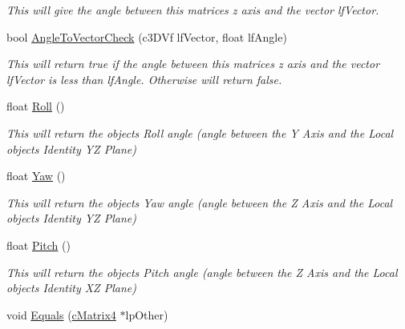 \begin{DoxyCompactItemize}
\begin{DoxyCompactList}\small\item\em This will give the angle between this matrices z axis and the vector lfVector. \end{DoxyCompactList}\item 
\hypertarget{classc_matrix4_a49146fe67ef49168a4136816398647dc}{
bool \hyperlink{classc_matrix4_a49146fe67ef49168a4136816398647dc}{AngleToVectorCheck} (c3DVf lfVector, float lfAngle)}
\label{classc_matrix4_a49146fe67ef49168a4136816398647dc}

\begin{DoxyCompactList}\small\item\em This will return true if the angle between this matrices z axis and the vector lfVector is less than lfAngle. Otherwise will return false. \end{DoxyCompactList}\item 
\hypertarget{classc_matrix4_ab118d7f14e3a34e1d65ed105aeea552e}{
float \hyperlink{classc_matrix4_ab118d7f14e3a34e1d65ed105aeea552e}{Roll} ()}
\label{classc_matrix4_ab118d7f14e3a34e1d65ed105aeea552e}

\begin{DoxyCompactList}\small\item\em This will return the objects Roll angle (angle between the Y Axis and the Local objects Identity YZ Plane) \end{DoxyCompactList}\item 
\hypertarget{classc_matrix4_af0b7c2e464763756c11b741d1f1266e4}{
float \hyperlink{classc_matrix4_af0b7c2e464763756c11b741d1f1266e4}{Yaw} ()}
\label{classc_matrix4_af0b7c2e464763756c11b741d1f1266e4}

\begin{DoxyCompactList}\small\item\em This will return the objects Yaw angle (angle between the Z Axis and the Local objects Identity YZ Plane) \end{DoxyCompactList}\item 
\hypertarget{classc_matrix4_a8832e5a8f1173fa0de619186ba13d0c2}{
float \hyperlink{classc_matrix4_a8832e5a8f1173fa0de619186ba13d0c2}{Pitch} ()}
\label{classc_matrix4_a8832e5a8f1173fa0de619186ba13d0c2}

\begin{DoxyCompactList}\small\item\em This will return the objects Pitch angle (angle between the Z Axis and the Local objects Identity XZ Plane) \end{DoxyCompactList}\item 
\hypertarget{classc_matrix4_a943edd1e04048bd2bcb93987a6c47819}{
void \hyperlink{classc_matrix4_a943edd1e04048bd2bcb93987a6c47819}{Equals} (\hyperlink{classc_matrix4}{cMatrix4} $\ast$lpOther)}
\label{classc_matrix4_a943edd1e04048bd2bcb93987a6c47819}


\end{DoxyCompactItemize}
